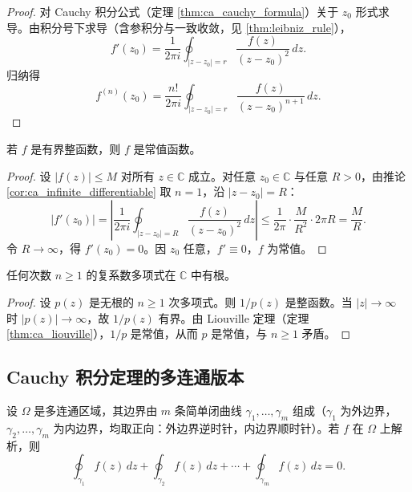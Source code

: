 \begin{proof}
对 Cauchy 积分公式（定理 \ref{thm:ca_cauchy_formula}）关于 $z_0$ 形式求导。由积分号下求导（含参积分与一致收敛，见 \cref{thm:leibniz_rule}），
\[
f'(z_0) = \frac{1}{2\pi i} \oint_{|z - z_0| = r} \frac{f(z)}{(z - z_0)^2} \, dz.
\]
归纳得
\[
f^{(n)}(z_0) = \frac{n!}{2\pi i} \oint_{|z - z_0| = r} \frac{f(z)}{(z - z_0)^{n+1}} \, dz.
\]
\end{proof}

\begin{theorem}[Liouville 定理]\label{thm:ca_liouville}
若 $f$ 是有界整函数，则 $f$ 是常值函数。
\end{theorem}

\begin{proof}
设 $|f(z)| \le M$ 对所有 $z \in \mathbb{C}$ 成立。对任意 $z_0 \in \mathbb{C}$ 与任意 $R > 0$，由推论 \ref{cor:ca_infinite_differentiable} 取 $n = 1$，沿 $|z - z_0| = R$：
\[
|f'(z_0)| = \left| \frac{1}{2\pi i} \oint_{|z - z_0| = R} \frac{f(z)}{(z - z_0)^2} \, dz \right| \le \frac{1}{2\pi} \cdot \frac{M}{R^2} \cdot 2\pi R = \frac{M}{R}.
\]
令 $R \to \infty$，得 $f'(z_0) = 0$。因 $z_0$ 任意，$f' \equiv 0$，$f$ 为常值。
\end{proof}

\begin{corollary}[代数基本定理]\label{cor:ca_fundamental_theorem_algebra}
任何次数 $n \ge 1$ 的复系数多项式在 $\mathbb{C}$ 中有根。
\end{corollary}

\begin{proof}
设 $p(z)$ 是无根的 $n \ge 1$ 次多项式。则 $1/p(z)$ 是整函数。当 $|z| \to \infty$ 时 $|p(z)| \to \infty$，故 $1/p(z)$ 有界。由 Liouville 定理（定理 \ref{thm:ca_liouville}），$1/p$ 是常值，从而 $p$ 是常值，与 $n \ge 1$ 矛盾。
\end{proof}

\subsection{Cauchy 积分定理的多连通版本}

\begin{theorem}\label{thm:ca_cauchy_multiply_connected}
设 $\Omega$ 是多连通区域，其边界由 $m$ 条简单闭曲线 $\gamma_1, \dots, \gamma_m$ 组成（$\gamma_1$ 为外边界，$\gamma_2, \dots, \gamma_m$ 为内边界，均取正向：外边界逆时针，内边界顺时针）。若 $f$ 在 $\Omega$ 上解析，则
\[
\oint_{\gamma_1} f(z) \, dz + \oint_{\gamma_2} f(z) \, dz + \cdots + \oint_{\gamma_m} f(z) \, dz = 0.
\]
\end{theorem}

